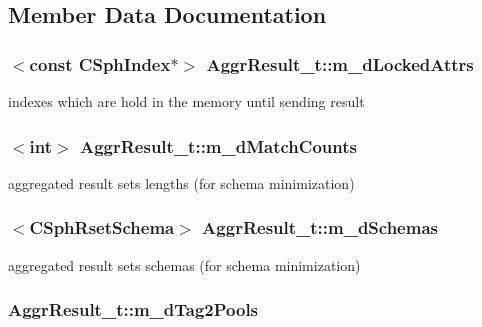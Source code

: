\subsection{Member Data Documentation}
\hypertarget{structAggrResult__t_a04227b919acd8a0b925b912a9991df0c}{
\subsubsection[{m\-\_\-d\-Locked\-Attrs}]{$<$const {\bf C\-Sph\-Index}$\ast$$>$ Aggr\-Result\-\_\-t\-::m\-\_\-d\-Locked\-Attrs}}\label{structAggrResult__t_a04227b919acd8a0b925b912a9991df0c}


indexes which are hold in the memory until sending result 

\hypertarget{structAggrResult__t_a8fb4c9631dfc7f05b1a17a0fdcc1a83d}{
\subsubsection[{m\-\_\-d\-Match\-Counts}]{$<${\bf int}$>$ Aggr\-Result\-\_\-t\-::m\-\_\-d\-Match\-Counts}}\label{structAggrResult__t_a8fb4c9631dfc7f05b1a17a0fdcc1a83d}


aggregated result sets lengths (for schema minimization) 

\hypertarget{structAggrResult__t_a52e63e87c90a4428ca009c0ecb3c0390}{
\subsubsection[{m\-\_\-d\-Schemas}]{$<${\bf C\-Sph\-Rset\-Schema}$>$ Aggr\-Result\-\_\-t\-::m\-\_\-d\-Schemas}}\label{structAggrResult__t_a52e63e87c90a4428ca009c0ecb3c0390}


aggregated result sets schemas (for schema minimization) 

\hypertarget{structAggrResult__t_ae2309ab0f12f4558435075b96f463084}{
\subsubsection[{m\-\_\-d\-Tag2\-Pools}]{ Aggr\-Result\-\_\-t\-::m\-\_\-d\-Tag2\-Pools}}\label{structAggrResult__t_ae2309ab0f12f4558435075b96f463084}


